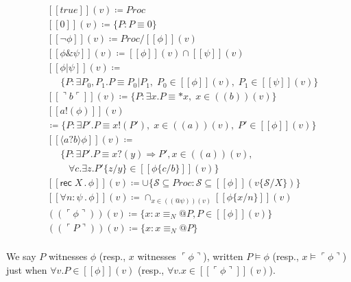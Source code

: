 \documentclass[]{acm_proc_article-sp}
\makeatletter
\newcommand{\ldb}{[\![}
\newcommand{\rdb}{]\!]}
\newcommand{\ldrb}{(\!(}
\newcommand{\rdrb}{)\!)}
\newcommand{\lpquote}{\ulcorner}
\newcommand{\rpquote}{\urcorner}
\newcommand{\id}[1]{\texttt{#1}}
\newcommand{\pzero}{\mathbin{0}}
\newcommand{\juxtap}{\mathbin{\id{|}}}
\newcommand{\concat}{\Rightarrow}
\newcommand{\scong}{\mathbin{\equiv}}
\newcommand{\nameeq}{\mathbin{\equiv_N}}
\newcommand{\binpar}[2]{#1 \juxtap #2}
\newcommand{\prefix}[3]{#1 ? ( #2 ) \concat #3}
\newcommand{\lift}[2]{#1 ! ( #2 )}
\newcommand{\quotep}[1]{@#1}
\newcommand{\dropn}[1]{*#1}
\newcommand{\substn}[2]{\id{\{} #1 / #2 \id{\}}}
\newcommand{\meaningof}[1]{\ldb #1 \rdb}
\newcommand{\pmeaningof}[1]{\ldb #1 \rdb}
\newcommand{\nmeaningof}[1]{\ldrb #1 \rdrb}
\newcommand{\Proc}{\mathbin{Proc}}
\newcommand{\defneqls}{\coloneqq}
\newcommand{\ptrue}{\mathbin{true}}
\newcommand{\pdropf}[1]{\rpquote #1 \lpquote}
\newcommand{\pquotep}[1]{\lpquote #1 \rpquote}
\newcommand{\plift}[2]{#1 ! ( #2 )}
\newcommand{\pprefix}[3]{\langle #1 ? #2 \rangle #3}
\newcommand{\pgfp}[2]{\textsf{rec} \; #1 \mathbin{.} #2}
\newcommand{\pquant}[3]{\forall #1 \mathbin{:} #2 \mathbin{.} #3}
\numberwithin{equation}{subsection}
\makeatother
\begin{document}
\begin{equation*}
  \begin{aligned}
  & \pmeaningof{\ptrue}(v) \defneqls \Proc \\ 
  & \pmeaningof{\pzero}(v) \defneqls \{ P : P \scong \pzero \}  \\ 
  & \pmeaningof{\neg \phi}(v) \defneqls \Proc / \pmeaningof{\phi}(v) \\
  & \pmeaningof{\phi \& \psi}(v) \defneqls \pmeaningof{\phi}(v) \cap \pmeaningof{\psi}(v) \\
  & \pmeaningof{\binpar{\phi}{\psi}}(v) \defneqls \\
  & \;\;\;\;\;\{ P : \exists P_0, P_1.P \scong \binpar{P_0}{P_1}, \; P_0 \in \pmeaningof{\phi}(v), \;  P_1 \in \pmeaningof{\psi}(v) \} \\
  & \pmeaningof{\pdropf{b}}(v) \defneqls \{ P : \exists x.P \scong {\dropn{x}}, \; x \in \nmeaningof{b}(v) \} \\	
  & \pmeaningof{\plift{a}{\phi}}(v) \\
  & \defneqls \{ P : \exists P'.P \scong {\lift{x}{P'}},
                                           \; x \in \nmeaningof{a}(v), 
                                           \; P' \in \pmeaningof{\phi}(v) \} \\
  & \pmeaningof{\pprefix{a}{b}{\phi}}(v) \defneqls \\
  & \;\;\;\;\;\{ P : \exists P'.P \scong {\prefix{x}{y}{P'}}, x \in \nmeaningof{a}(v), \\
  & \;\;\;\;\;\; \; \; \forall c . \exists z . {P'}\substn{z}{y} \in \pmeaningof{{\phi}\substn{c}{b}}(v) \} \\
  & \pmeaningof{\pgfp{X}{\phi}}(v) \defneqls \cup \{ \mathcal{S} \subseteq \Proc : \mathcal{S} \subseteq \pmeaningof{\phi}(v\substn{\mathcal{S}}{X})\} \\
  & \pmeaningof{\pquant{n}{\psi}{\phi}}(v) \defneqls \cap_{x \in \nmeaningof{\quotep{\psi}}(v)} \pmeaningof{{\phi}\substn{x}{n}}(v) \\
  & \nmeaningof{\pquotep{\phi}}(v) \defneqls \{ x : x \nameeq \quotep{P}, P \in \pmeaningof{\phi}(v) \} \\
  & \nmeaningof{\pquotep{P}}(v) \defneqls \{ x : x \nameeq  \quotep{P} \} \\
  \end{aligned}
\end{equation*}

We say $P$ witnesses $\phi$ (resp., $x$ witnesses $\pquotep{\phi}$),
written $P \models \phi$ (resp., $x \models \pquotep{\phi}$) just when
$\forall v . P \in \meaningof{\phi}(v)$ (resp., $\forall v . x \in \meaningof{\pquotep{\phi}}(v)$).
\end{document}
